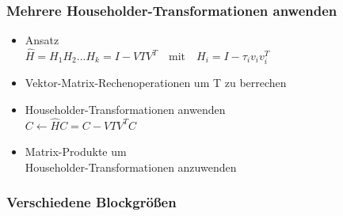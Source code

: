 \begin{frame}
	\frametitle{Mehrere Householder-Transformationen anwenden}	
	\vspace{-1cm}	
		\begin{itemize}
			\item Ansatz\\
			\vspace{0.3cm}
			$\hat{H} = H_1H_2...H_k = I - VTV^T \quad \text{mit}\quad H_i = I - \tau_i v_iv_i^T $
			\vspace{0.3cm}
			\item  Vektor-Matrix-Rechenoperationen um T zu berrechen
			\item Householder-Transformationen anwenden\\
			\vspace{0.3cm}
			$ C \leftarrow \hat{H} C = C - V T V^T C \quad $
			\item  Matrix-Produkte um \\ Householder-Transformationen anzuwenden
			
		\end{itemize}

		\vspace{-4cm}
		\hspace{9.6cm}
		\centering
		
\end{frame}



\begin{frame}
\frametitle{Verschiedene Blockgrößen}
		\centering
\end{frame}

